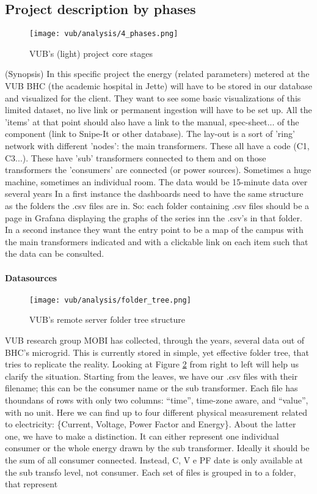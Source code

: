 \subsection{Project description by phases}
\begin{figure}[ht]
    \texttt{[image: vub/analysis/4\_phases.png]}
    \caption{\ac{VUB}'s (light) project core stages}
    \label{fig:vub_stages}
\end{figure}
(Synopsis)
In this specific project the energy (related parameters) metered at the VUB BHC (the academic hospital in Jette) will have to be stored in our database and visualized for the client. 
They want to see some basic visualizations of this limited dataset, no live link or permanent ingestion will have to be set up.
All the 'items' at that point should also have a link to the manual, spec-sheet... of the component (link to Snipe-It or other database).
The lay-out is a sort of 'ring' network with different 'nodes': the main transformers. These all have a code (C1, C3...). 
These have 'sub' transformers connected to them and on those transformers the 'consumers' are connected (or power sources). Sometimes a huge machine, sometimes an individual room.
The data would be 15-minute data over several years
In a first instance the dashboards need to have the same structure as the folders the .csv files are in. So: each folder containing .csv files should be a page in Grafana 
displaying the graphs of the series inn the .csv's in that folder.
In a second instance they want the entry point to be a map of the campus with the main transformers indicated and with a clickable link on each item such that the data can be consulted. 

\paragraph{Datasources}
\begin{figure}[ht]
    \texttt{[image: vub/analysis/folder\_tree.png]}
    \caption{\ac{VUB}'s remote server folder tree structure}
    \label{fig:vub_folder_tree}
\end{figure}
\ac{VUB} research group MOBI has collected, through the years, several data out of \ac{BHC}'s microgrid.
This is currently stored in simple, yet effective folder tree, that tries to replicate the reality. 
Looking at Figure \ref{fig:vub_folder_tree} from right to left will help us clarify the situation. 
Starting from the leaves, we have our .csv files with their filename; this can be the consumer name or the sub transformer. 
Each file has thoundans of rows with only two columns: ``time'', time-zone aware, and ``value'', with no unit.
Here we can find up to four different physical measurement related to electricity: \{Current, Voltage, Power Factor and Energy\}.
About the latter one, we have to make a distinction. It can either represent one individual consumer or the whole energy drawn by the sub transformer. 
Ideally it should be the sum of all consumer connected. Instead, C, V e PF date is only available at the sub transfo level, not consumer.
Each set of files is grouped in to a folder, that represent  

